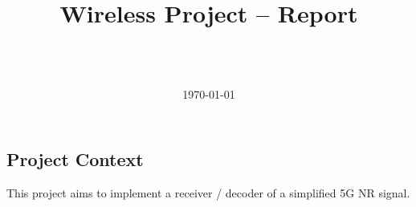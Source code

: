 \documentclass[a4paper, 12pt, twoside]{article}
\title{Wireless Project -- Report}
\author{
    \\ \NameA
    \\ \NameB
}
\date{
    \today
}
\begin{document}
    
    \maketitle

    \tableofcontents
    \newpage


    \begin{indt}{\section{Project Context}} %
        This project aims to implement a receiver / decoder of a simplified 5G NR signal.
    \end{indt} %
\end{document}
